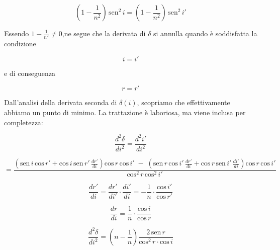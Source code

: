 \documentclass{article}
\begin{document}
\begin{equation}
\left( 1 - \frac{1}{n^2} \right) \, \textrm{sen}^2 \, i = \left( 1 - \frac{1}{n^2} \right) \, \textrm{sen}^2 \, i' 
\end{equation}

\vspace{2mm}

Essendo $1-\frac{1}{n^2} \neq 0$,ne segue che la derivata di $\delta$ si annulla quando è soddisfatta la condizione

\begin{equation}
i=i'
\end{equation}

e di conseguenza

\begin{equation}
r=r'
\end{equation}

Dall'analisi della derivata seconda di $\delta(i)$, scopriamo che effettivamente abbiamo un punto di minimo. La trattazione è laboriosa, ma viene inclusa per completezza:

\vspace{2mm}

\[\frac{d^2 \delta}{di^2} = \frac{d^2 i'}{di^2} \]

\begin{equation}
= \frac{(\textrm{sen} \, i \, \textrm{cos} \, r' + \textrm{cos} \, i \, \textrm{sen} \, r' \, \frac{dr'}{di})\textrm{cos} \, r \, \textrm{cos} \, i' \;-\; (\textrm{sen} \, r \, \textrm{cos} \, i' \, \frac{dr'}{di} + \textrm{cos} \, r \, \textrm{sen} \, i' \, \frac{di'}{di})\textrm{cos} \, r \, \textrm{cos} \, i' }{\textrm{cos}^2 \, r \, \textrm{cos}^2 \, i'}
\end{equation}

\vspace{2mm}

\begin{equation}
\frac{dr'}{di}=\frac{dr'}{di'}\cdot \frac{di'}{di}=-\frac{1}{n}\cdot \frac{\textrm{cos} \, i'}{\textrm{cos} \, r'}
\end{equation}

\vspace{3mm}

\begin{equation}
\frac{dr}{di} = \frac{1}{n}\cdot \frac{\textrm{cos} \, i}{\textrm{cos} \, r}
\end{equation}

\vspace{3mm}

\begin{equation}
\frac{d^2 \delta}{di^2}=\left(n-\frac{1}{n} \right) \frac{2\, \textrm{sen}\, r}{\textrm{cos}^2 \, r \cdot \textrm{cos} \, i}
\end{equation}
\end{document}
